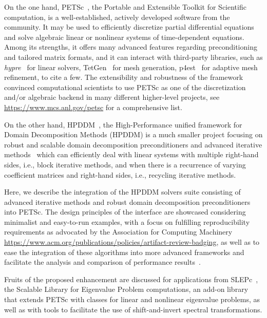 \documentclass[3p,11pt]{elsarticle}
\begin{document}
On the one hand, PETSc~\cite{petsc-web-page,petsc-user-ref}, the
Portable and Extensible Toolkit for Scientific computation, is a
well-established, actively developed software from the community. It may be used to efficiently
discretize partial differential equations and solve algebraic linear or
nonlinear systems of time-dependent equations. Among its strengths, it offers many
advanced features regarding preconditioning and tailored matrix formats, and it can
interact with third-party libraries, such as
\emph{hypre}~\cite{falgout2002hypre} for linear solvers, TetGen~\cite{si2013tet}
for mesh generation, p4est~\cite{BursteddeWilcoxGhattas11} for adaptive mesh
refinement, to cite a few. The extensibility and robustness of the framework
convinced computational scientists to use PETSc as one of the discretization and/or algebraic backend in
many different higher-level projects, see \url{https://www.mcs.anl.gov/petsc} for a comprehensive list.

On the other hand, HPDDM~\cite{jolivet2013scalable}, the High-Performance unified framework for Domain Decomposition Methods (HPDDM)
is a much smaller project focusing on robust and scalable domain decomposition
preconditioners and advanced iterative
methods~\cite{jolivet2016block} which can efficiently deal with linear
systems with multiple right-hand sides, i.e., block iterative methods,
and when there is a recurrence of varying coefficient matrices and right-hand
sides, i.e., recycling iterative methods.

Here, we describe the integration of the HPDDM solvers suite consisting of advanced iterative
methods and robust domain decomposition preconditioners into PETSc.
The design principles of the interface are showcased considering %
minimalist and easy-to-run examples, with a focus on fulfilling reproducibility requirements as advocated by the
Association for Computing Machinery
\url{https://www.acm.org/publications/policies/artifact-review-badging}, as well as to 
ease the integration of these algorithms into more advanced frameworks
and facilitate the analysis and comparison of performance results~\cite{hoefler2015scientific}.

Fruits of the proposed enhancement are discussed for applications from
SLEPc~\cite{hernandez2005ssf}, the Scalable Library for Eigenvalue Problem
computations, an add-on library that extends PETSc with classes for
linear and nonlinear eigenvalue problems, as well as with tools to facilitate
the use of shift-and-invert spectral transformations.
\end{document}
